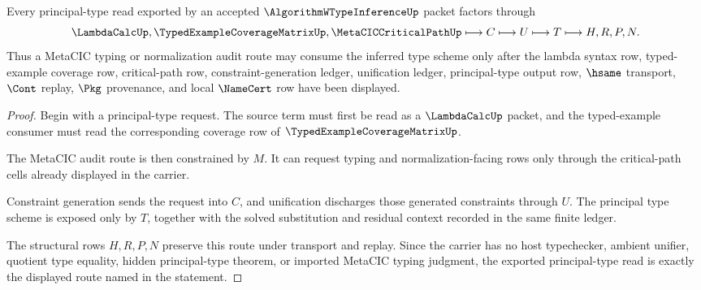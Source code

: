 \begin{theorem}
\label{thm:algorithm-w-type-inference-principal-type-route}
Every principal-type read exported by an accepted $\AlgorithmWTypeInferenceUp$ packet factors through
$$
\LambdaCalcUp,\TypedExampleCoverageMatrixUp,\MetaCICCriticalPathUp
\longmapsto C \longmapsto U \longmapsto T \longmapsto H,R,P,N .
$$
Thus a MetaCIC typing or normalization audit route may consume the inferred type scheme only after the lambda syntax row, typed-example coverage row, critical-path row, constraint-generation ledger, unification ledger, principal-type output row, $\hsame$ transport, $\Cont$ replay, $\Pkg$ provenance, and local $\NameCert$ row have been displayed.
\end{theorem}
\begin{proof}
Begin with a principal-type request. The source term must first be read as a $\LambdaCalcUp$ packet, and the typed-example consumer must read the corresponding coverage row of $\TypedExampleCoverageMatrixUp$.

The MetaCIC audit route is then constrained by $M$. It can request typing and normalization-facing rows only through the critical-path cells already displayed in the carrier.

Constraint generation sends the request into $C$, and unification discharges those generated constraints through $U$. The principal type scheme is exposed only by $T$, together with the solved substitution and residual context recorded in the same finite ledger.

The structural rows $H,R,P,N$ preserve this route under transport and replay. Since the carrier has no host typechecker, ambient unifier, quotient type equality, hidden principal-type theorem, or imported MetaCIC typing judgment, the exported principal-type read is exactly the displayed route named in the statement.
\end{proof}


